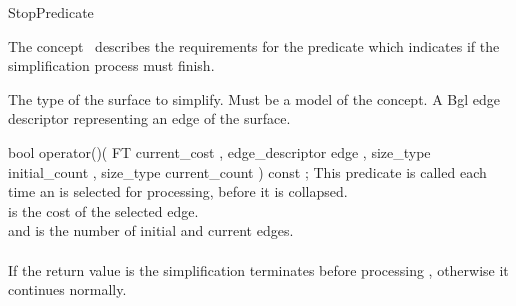 
\begin{ccRefConcept}{StopPredicate}


\ccDefinition

The concept \ccRefName\ describes the requirements for the predicate which indicates if the simplification process must finish.

\ccTypes
  {The type of the surface to simplify. Must be a model of the  concept.}{}
\ccGlue    
\ccGlue    
\ccGlue    
  {A {\sc Bgl} edge descriptor representing an edge of the surface.}

\ccCreation
{}  %

\ccOperations

  \ccMethod
    {bool  operator()( FT              current_cost
                     , edge_descriptor edge
                     , size_type       initial_count
                     , size_type       current_count
                     ) const ;
    }
    {
    This predicate is called each time an  is selected for processing,
     before it is collapsed.\\
     is the cost of the selected edge.\\
     and  is the number of initial and current edges.\\
    \\
    If the return value is  the simplification terminates before processing ,
    otherwise it continues normally.
    }
  
\ccHasModels
{}

\end{ccRefConcept}

